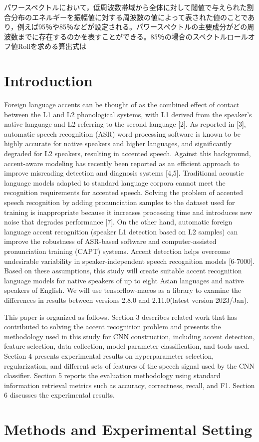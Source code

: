 パワースペクトルにおいて，低周波数帯域から全体に対して閾値で与えられた割合分布のエネルギーを振幅値に対する周波数の値によって表された値のことであり，例えば95％や85％などが設定される。パワースペクトルの主要成分がどの周波数までに存在するのかを表すことができる。85％の場合のスペクトルロールオフ値Rollを求める算出式は\documentclass[ams]{U-AizuGT}
\begin{document}
\section{Introduction}
Foreign language accents can be thought of as the combined effect of contact between the L1 and L2 phonological systems, with L1 derived from the speaker's native language and L2 referring to the second language [2]. As reported in [3], automatic speech recognition (ASR) word processing software is known to be highly accurate for native speakers and higher languages, and significantly degraded for L2 speakers, resulting in accented speech. Against this background, accent-aware modeling has recently been reported as an efficient approach to improve misreading detection and diagnosis systems [4,5]. Traditional acoustic language models adapted to standard language corpora cannot meet the recognition requirements for accented speech. Solving the problem of accented speech recognition by adding pronunciation samples to the dataset used for training is inappropriate because it increases processing time and introduces new noise that degrades performance [7]. On the other hand, automatic foreign language accent recognition (speaker L1 detection based on L2 samples) can improve the robustness of ASR-based software and computer-assisted pronunciation training (CAPT) systems. Accent detection helps overcome undesirable variability in speaker-independent speech recognition models [6-7000]. Based on these assumptions, this study will create suitable accent recognition language models for native speakers of up to eight Asian languages and native speakers of English. We will use tensorflow-macos as a library to examine the differences in results between versions 2.8.0 and 2.11.0(latest version 2023/Jan).\par
This paper is organized as follows. Section 3 describes related work that has contributed to solving the accent recognition problem and presents the methodology used in this study for CNN construction, including accent detection, feature selection, data collection, model parameter classification, and tools used. Section 4 presents experimental results on hyperparameter selection, regularization, and different sets of features of the speech signal used by the CNN classifier. Section 5 reports the evaluation methodology using standard information retrieval metrics such as accuracy, correctness, recall, and F1. Section 6 discusses the experimental results.

\section{Methods and Experimental Setting}
\end{document}
